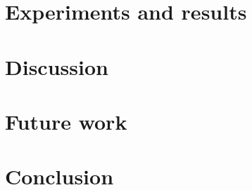 \documentclass[a4paper]{report}
\begin{document}
% 
%
% 
%
% 
% 
%
% 

% 
%
\chapter{Experiments and results}
\label{chap:exp}


\chapter{Discussion}


\chapter{Future work}


\chapter{Conclusion}

%
\end{document}
